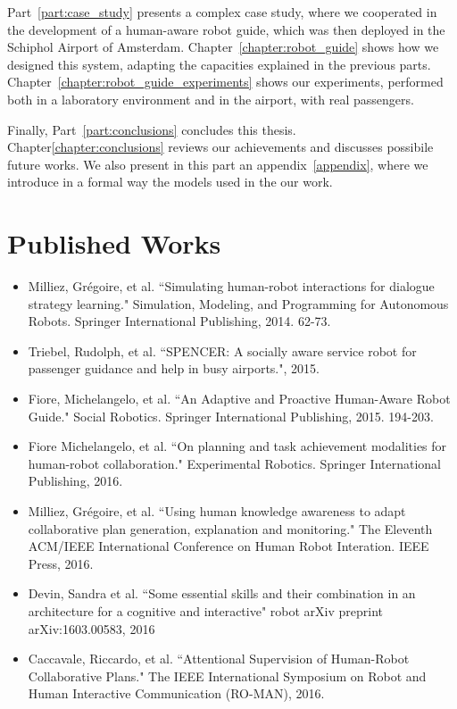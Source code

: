 Part~\ref{part:case_study} presents a complex case study, where we cooperated in the development of a human-aware robot guide, which was then deployed in the Schiphol Airport of Amsterdam. Chapter~\ref{chapter:robot_guide} shows how we designed this system, adapting the capacities explained in the previous parts. Chapter~\ref{chapter:robot_guide_experiments} shows our experiments, performed both in a laboratory environment and in the airport, with real passengers.

Finally, Part~\ref{part:conclusions} concludes this thesis. Chapter\ref{chapter:conclusions} reviews our achievements and discusses possibile future works. We also present in this part an appendix~\ref{appendix}, where we introduce in a formal way the models used in the our work.

\section{Published Works}
\begin{itemize}
\item Milliez, Grégoire, et al. ``Simulating human-robot interactions for dialogue strategy learning." Simulation, Modeling, and Programming for Autonomous Robots. Springer International Publishing, 2014. 62-73.
\item Triebel, Rudolph, et al. ``SPENCER: A socially aware service robot for passenger guidance and help in busy airports.", 2015.
\item Fiore, Michelangelo, et al. ``An Adaptive and Proactive Human-Aware Robot Guide." Social Robotics. Springer International Publishing, 2015. 194-203.
\item Fiore Michelangelo, et al. ``On planning and task achievement modalities for human-robot collaboration." Experimental Robotics. Springer International Publishing, 2016.
\item Milliez, Grégoire, et al. ``Using human knowledge awareness to adapt collaborative plan generation, explanation and monitoring." The Eleventh ACM/IEEE International Conference on Human Robot Interation. IEEE Press, 2016.
\item Devin, Sandra et al. ``Some essential skills and their combination in an architecture for a cognitive and interactive" robot arXiv preprint arXiv:1603.00583, 2016
\item Caccavale, Riccardo, et al. ``Attentional Supervision of Human-Robot Collaborative Plans." The IEEE International Symposium on Robot and Human Interactive Communication (RO-MAN), 2016.
\end{itemize}


